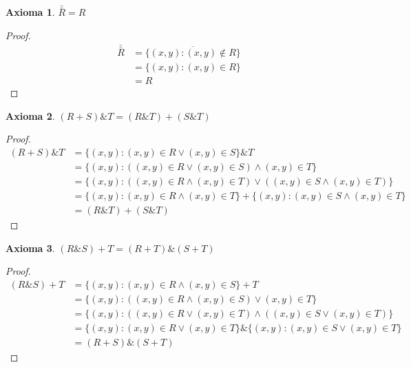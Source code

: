 \documentclass{article}
\newtheorem*{axiom}{Axioma}
\begin{document}
\begin{axiom}
  $\bar{\bar{R}} = R$
\end{axiom}
\begin{proof}
  \begin{equation*}
    \begin{aligned}
      \bar{\bar{R}} &= \overline{\{(x, y) : (x, y) \notin R\}} \\ 
                    &= \{(x, y) : (x, y) \in R\} \\ 
                    &= R
    \end{aligned}
  \end{equation*}
\end{proof}

\begin{axiom}
  $(R+S)\& T = (R \& T) + (S \& T)$
\end{axiom}
\begin{proof}
  \begin{equation*}
    \begin{aligned}
      (R+S) \& T &= \{(x, y) : (x, y) \in R \lor (x, y) \in S\} \& T \\ 
                 &= \{(x, y) : ((x, y) \in R \lor (x, y) \in S) \land (x, y) \in T\} \\ 
                 &= \{(x, y) : ((x, y) \in R \land (x, y) \in T) \lor ((x, y) \in S \land (x, y) \in T)\} \\ 
                 &= \{(x, y) : (x, y) \in R \land (x, y) \in T\} + \{(x, y) : (x, y) \in S \land (x, y) \in T\} \\ 
                 &= (R \& T) + (S \& T)
    \end{aligned}
  \end{equation*}
\end{proof}

\begin{axiom}
  $(R \& S) + T = (R+T) \& (S+T)$
\end{axiom}
\begin{proof}
  \begin{equation*}
    \begin{aligned}
      (R \& S) + T &= \{(x, y) : (x, y) \in R \land (x, y) \in S\} + T \\ 
                   &= \{(x, y) : ((x, y) \in R \land (x, y) \in S) \lor (x, y) \in T\} \\ 
                   &= \{(x, y) : ((x, y) \in R \lor (x, y) \in T) \land ((x, y) \in S \lor (x, y) \in T)\} \\ 
                   &= \{(x, y) : (x, y) \in R \lor (x, y) \in T\} \& \{(x, y) : (x, y) \in S \lor (x, y) \in T\} \\ 
                   &= (R+S) \& (S+T)
    \end{aligned}
  \end{equation*}
\end{proof}
\end{document}
